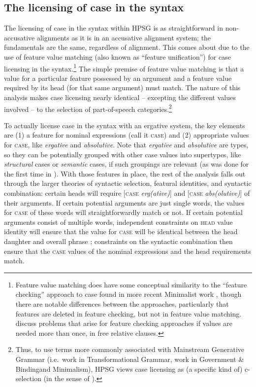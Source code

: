 \documentclass[output=paper,biblatex,babelshorthands,newtxmath,draftmode,colorlinks,citecolor=brown]{langscibook}
\begin{document}
\subsection{The licensing of case in the syntax}

The licensing of case in the syntax within HPSG is as straightforward in non-accusative alignments
as it is in an accusative alignment system; the fundamentals are the same, regardless of
alignment. This comes about due to the use of feature value matching (also known as ``feature
unification'') for case licensing in the syntax.\footnote{Feature value matching does have some
  conceptual similarity to the ``feature checking'' approach to case found in more recent Minimalist
  work \citep{Chomsky91a-u,Chomsky93b-u,adger2000,Adger2010a,framgut06,pestor07}\iaddpages, though
  there are notable differences between the approaches, particularly that features are deleted in
  feature checking, but not in feature value
  matching.  discuss
  problems that arise for feature checking approaches if values are needed more than once, \eg in
  free relative clauses. } The simple premise of feature value matching is that a value for a
particular feature possessed by an argument and a feature value required by its head (for that same
argument) must match. The nature of this analysis makes case licensing nearly identical -- excepting
the different values involved -- to the selection of part-of-speech categories.\footnote{Thus, to
  use terms more commonly associated with Mainstream Generative Grammar (i.e.\ work in
  Transformational Grammar, \eg work in Government \& Binding\indexgb and Minimalism\indexminimalism \citealt{Chomsky81a,Chomsky95a-u}), HPSG views case licensing as (a
  specific kind of) c-selection (in the sense of \citealt{Grimshaw79a-u}).}

To actually license case in the syntax with an ergative system, the key elements are (1)
a feature for nominal expressions (call it \textsc{case}) and (2) appropriate values for
\textsc{case}, like \textit{ergative} and \textit{absolutive}. Note that \textit{ergative} and
\textit{absolutive} are types, so they can be potentially grouped with other case values into
supertypes, like \textit{structural} cases or \textit{semantic} cases, if such groupings are
relevant (as was done for the first time in \citealt[]{HM94a}). With those features in
place, the rest of the analysis falls out through the larger theories of syntactic selection,
featural identities, and syntactic combination: certain heads will require [\textsc{case}
\textit{erg(ative)}] and [\textsc{case} \textit{abs(olutive)}] of their arguments. If certain
potential arguments are just single words, the values for \textsc{case} of these words will
straightforwardly match or not. If certain potential arguments consist of multiple words,
independent constraints on \textsc{head} value identity will ensure that the value for \textsc{case}
will be identical between the head daughter and overall phrase
\crossrefchapterp[\pageref{page-hfp}]{properties}; constraints on the syntactic combination then
ensure that the \textsc{case} values of the nominal expressions and the head requirements match.
\end{document}
